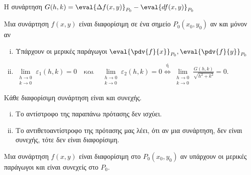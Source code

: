 \begin{rem}
\item {}
  Η συνάρτηση $ G(h,k) = \eval{\Delta f(x,y)}_{P_{0}} - \eval{df(x,y)}_{P_{0}} $
\end{rem}

\begin{dfn}[Επαναδιατύπωση]
\item {}
  Μια συνάρτηση $ f(x,y) $ είναι διαφορίσιμη σε ένα σημείο $ P_{0}(x_{0}, y_{0}) $ αν
  και μόνον αν
  \begin{enumerate}[i)]
    \item Υπάρχουν οι μερικές παράγωγοι $ \eval{\pdv{f}{x}}_{P_{0}},
      \eval{\pdv{f}{y}}_{P_{0}} $
    \item $ \lim\limits_{\substack{h\to 0 \\k \to 0}} \varepsilon _{1}(h,k) = 
      0 \quad \text{και} \quad \lim\limits_{\substack{h\to 0 \\k \to 0}} 
      \varepsilon _{2}(h,k)=0 \overset{\text{ή}}{\Leftrightarrow} 
      \lim\limits_{\substack{h\to 0 \\k \to 0}} 
      \frac{G(h,k)}{\sqrt{h^{2}+k^{2}}} = 0 $.
  \end{enumerate}
\end{dfn}

\begin{prop}
  Κάθε διαφορίσιμη συνάρτηση είναι και συνεχής.
\end{prop}

\begin{rem}
\item {}
  \begin{enumerate}[i)]
    \item Το αντίστροφο της παραπάνω πρότασης δεν ισχύει.
    \item Το αντιθετοαντίστροφο της πρότασης μας λέει, ότι αν μια συνάρτηση, 
      δεν είναι συνεχής, τότε δεν είναι διαφορίσιμη.
  \end{enumerate}
\end{rem}
\begin{thm}
\item {}
  Μια συνάρτηση $ f(x,y) $ είναι διαφορίσιμη στο $ P_{0}(x_{0}, y_{0}) $ 
  αν υπάρχουν οι μερικές παράγωγοι και είναι συνεχείς στο $ P_{0} $.
\end{thm}

\newpage

